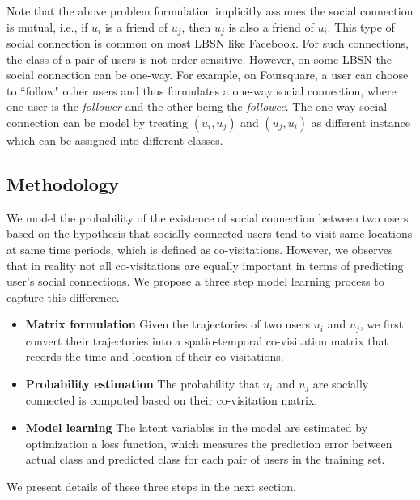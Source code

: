 Note that the above problem formulation implicitly assumes the social connection is mutual, i.e., if $u_i$ is a friend of $u_j$, then $u_j$ is also a friend of $u_i$. This type of social connection is common on most LBSN like Facebook. For such connections, the class of a pair of users is not order sensitive. However, on some LBSN the social connection can be one-way. For example, on Foursquare, a user can choose to ``follow" other users and thus formulates a one-way social connection, where one user is the \textit{follower} and the other being the \textit{followee}. The one-way social connection can be model by treating $(u_i, u_j)$ and $(u_j, u_i)$ as different instance which can be assigned into different classes.


\subsection{Methodology} \label{sec:method}

We model the probability of the existence of social connection between two users based on the hypothesis that socially connected users tend to visit same locations at same time periods, which is defined as co-visitations. However, we observes that in reality not all co-visitations are equally important in terms of predicting user's social connections. We propose a three step model learning process to capture this difference.

\begin{itemize}
\item \textbf{Matrix formulation} Given the trajectories of two users $u_i$ and $u_j$, we first convert their trajectories into a spatio-temporal co-visitation matrix that records the time and location of their co-visitations.

\item \textbf{Probability estimation}  The probability that $u_i$ and $u_j$ are socially connected is computed based on their co-visitation matrix.

\item \textbf{Model learning} The latent variables in the model are estimated by optimization a loss function, which measures the prediction error between actual class and predicted class for each pair of users in the training set.
\end{itemize}

We present details of these three steps in the next section.

\iffalse

Research questions worth exploring in the future

1. Active user vs Non-active users?
2. Percentage of social connections can be explained by trajectories? 
3. Most significant types of locations?
4. Most significant time slots?
5. Geo-distance and predictive power?

\fi